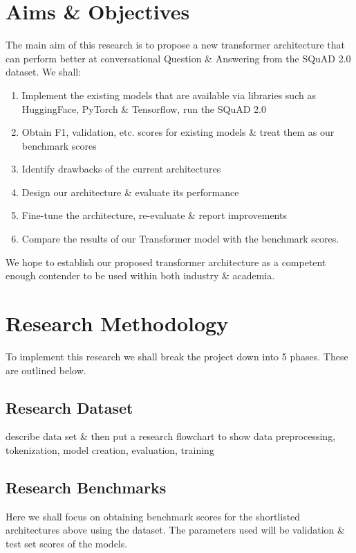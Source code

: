 \documentclass[11pt]{article}
\begin{document}
\newpage
\newpage
\section{Aims \& Objectives}\label{aims}

The main aim of this research is to propose a new transformer architecture that can perform better at conversational Question \& Answering from the SQuAD 2.0 dataset\cite{dataset}.
We shall:
\begin{enumerate}
    \item Implement the existing models that are available via libraries such as HuggingFace\cite{hfTransformers}, PyTorch \& Tensorflow, run the SQuAD 2.0\cite{dataset}
    \item Obtain F1, validation, etc. scores for existing models \& treat them as our benchmark scores
    \item Identify drawbacks of the current architectures
    \item Design our architecture \& evaluate its performance
    \item Fine-tune the architecture, re-evaluate \& report improvements
    \item Compare the results of our Transformer model with the benchmark scores.
\end{enumerate}
We hope to establish our proposed transformer architecture as a competent enough contender to be used within both industry \& academia.
\section{Research Methodology}\label{researchMeth}

To implement this research we shall break the project down into 5 phases. These are outlined below.
\subsection{Research Dataset}\label{datas}

describe data set \& then put a research flowchart to show data preprocessing, tokenization, model creation, evaluation, training
\subsection{Research Benchmarks}\label{benchmarks}
Here we shall focus on obtaining benchmark scores for the shortlisted architectures above using the dataset\cite{dataset}. The parameters used will be validation \& test set scores of the models.
\end{document}
